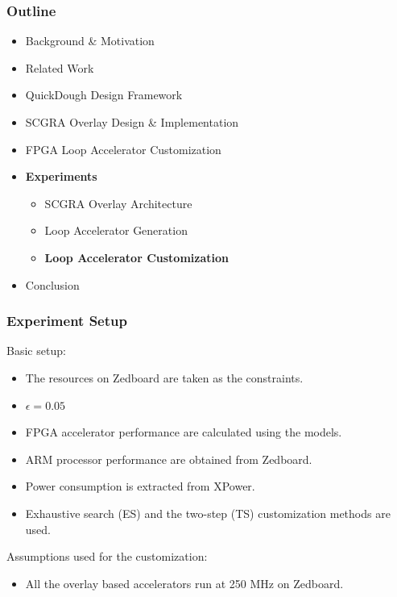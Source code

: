 \documentclass[accentcolor=tud1a,colorbacktitle,inverttitle,landscape,german,presentation,t]{tudbeamer}
\begin{document}
  \begin{frame}
  \frametitle{Outline}
  \begin{itemize}
  \setlength{\itemsep}{6pt}
  \item Background \& Motivation
  \item Related Work
  \item QuickDough Design Framework
  \item SCGRA Overlay Design \& Implementation
  \item FPGA Loop Accelerator Customization
  \item \textbf{Experiments}
  \begin{itemize}
    \setlength{\itemsep}{6pt}
    \item SCGRA Overlay Architecture
    \item Loop Accelerator Generation
    \item \textbf{Loop Accelerator Customization}
  \end{itemize}
  \item Conclusion
  \end{itemize}
  \end{frame}

  \begin{frame}
  \frametitle{Experiment Setup}
  Basic setup:
  \begin{itemize}
    \item The resources on Zedboard are taken as the constraints.
    \item $\epsilon = 0.05$ 
    \item FPGA accelerator performance are calculated using the models. 
    \item ARM processor performance are obtained from Zedboard.
    \item Power consumption is extracted from XPower. 
    \item Exhaustive search (ES) and the two-step (TS) customization methods are used.
  \end{itemize}
  \vspace{1em}
  Assumptions used for the customization:
  \begin{itemize}
  \item All the overlay based accelerators run at 250 MHz on Zedboard.
  \end{itemize}
  \end{frame}
\end{document}
